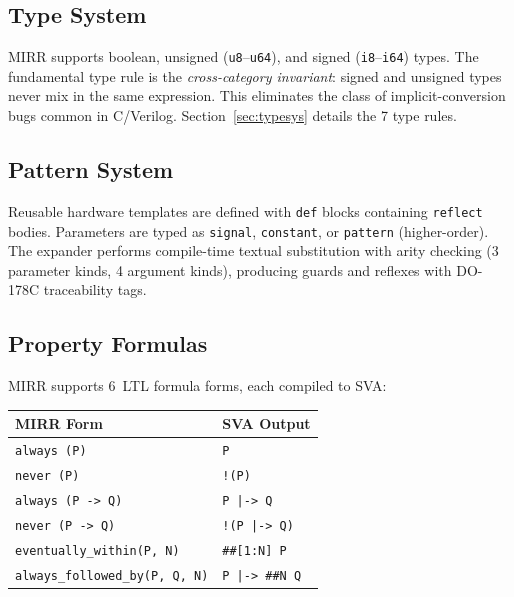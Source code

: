 \documentclass[conference]{IEEEtran}
\begin{document}
\subsection{Type System}

MIRR supports boolean, unsigned (\texttt{u8}--\texttt{u64}), and signed
(\texttt{i8}--\texttt{i64}) types.  The fundamental type rule is the
\emph{cross-category invariant}: signed and unsigned types never mix
in the same expression.  This eliminates the class of implicit-conversion
bugs common in C/Verilog.  Section~\ref{sec:typesys} details the 7 type
rules.

\subsection{Pattern System}

Reusable hardware templates are defined with \texttt{def} blocks
containing \texttt{reflect} bodies.  Parameters are typed as
\texttt{signal}, \texttt{constant}, or \texttt{pattern} (higher-order).
The expander performs compile-time textual substitution with arity
checking (3 parameter kinds, 4 argument kinds), producing guards and
reflexes with DO-178C traceability tags.

\subsection{Property Formulas}

MIRR supports 6~LTL formula forms, each compiled to SVA:

\begin{center}
\footnotesize
\begin{tabular}{@{}ll@{}}
\toprule
\textbf{MIRR Form} & \textbf{SVA Output} \\
\midrule
\texttt{always (P)} & \texttt{P} \\
\texttt{never (P)} & \texttt{!(P)} \\
\texttt{always (P -> Q)} & \texttt{P |-> Q} \\
\texttt{never (P -> Q)} & \texttt{!(P |-> Q)} \\
\texttt{eventually\_within(P, N)} & \texttt{\#\#[1:N] P} \\
\texttt{always\_followed\_by(P, Q, N)} & \texttt{P |-> \#\#N Q} \\
\bottomrule
\end{tabular}
\end{center}

\end{document}
